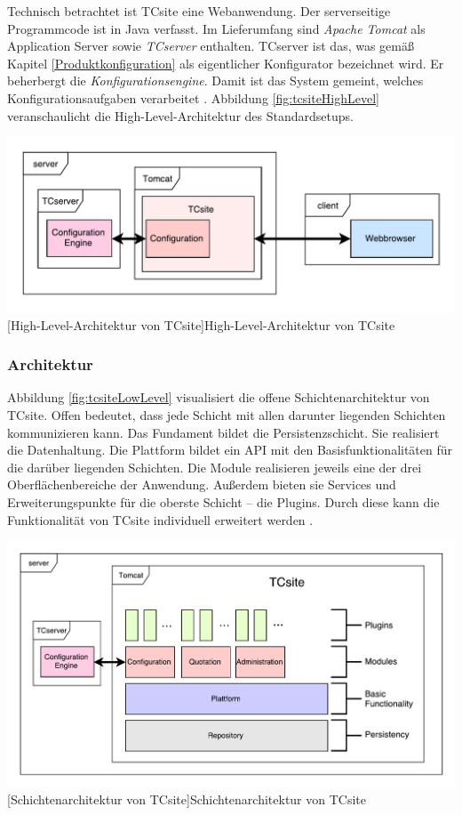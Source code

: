 \documentclass[11pt, a4paper, titlepage, listof=totoc, bibliography=totoc, index=totoc, twoside, openright, headings=normal]{scrreprt}
\begin{document}
Technisch betrachtet ist TCsite eine Webanwendung. Der serverseitige Programmcode ist in Java verfasst. Im Lieferumfang sind \emph{Apache Tomcat} als Application Server sowie \emph{TCserver} enthalten. TCserver ist das, was gemäß Kapitel \ref{Produktkonfiguration} als eigentlicher Konfigurator bezeichnet wird. Er beherbergt die \emph{Konfigurationsengine}. Damit ist das System gemeint, welches Konfigurationsaufgaben verarbeitet \citep{tactonTCsiteHandbook}. Abbildung \ref{fig:tcsiteHighLevel} veranschaulicht die High-Level-Architektur des Standardsetups.

\vspace{1em}
\begin{minipage}{\linewidth}
	\centering
	\includegraphics[width=0.7\linewidth]{Abbildungen/tcsiteHighLevel.pdf}
	[High-Level-Architektur von TCsite]{High-Level-Architektur von TCsite}
	\label{fig:tcsiteHighLevel}
\end{minipage}

\subsubsection{Architektur}
\label{TCsiteArchitektur}

Abbildung \ref{fig:tcsiteLowLevel} visualisiert die offene Schichtenarchitektur von TCsite. Offen bedeutet, dass jede Schicht mit allen darunter liegenden Schichten kommunizieren kann. Das Fundament bildet die Persistenzschicht. Sie realisiert die Datenhaltung. Die Plattform bildet ein \ac{API} mit den Basisfunktionalitäten für die darüber liegenden Schichten. Die Module realisieren jeweils eine der drei Oberflächenbereiche der Anwendung. Außerdem bieten sie Services und Erweiterungspunkte für die oberste Schicht -- die Plugins. Durch diese kann die Funktionalität von TCsite individuell erweitert werden \citep{tactonTCsiteDevelopmentManual}.

\vspace{1em}
\begin{minipage}{\linewidth}
	\centering
	\includegraphics[width=0.7\linewidth]{Abbildungen/tcsiteLowLevel.pdf}
	[Schichtenarchitektur von TCsite]{Schichtenarchitektur von TCsite}
	\label{fig:tcsiteLowLevel}
\end{minipage}
\vspace{0.3em}
\end{document}
